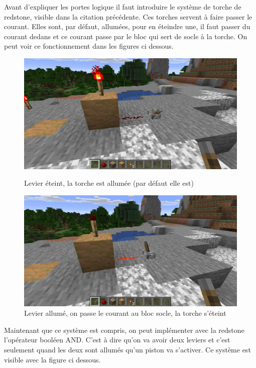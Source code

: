\newpage

Avant d'expliquer les portes logique il faut introduire le système de torche de redstone, visible dans la citation précédente. Ces torches servent à faire passer le courant. Elles sont, par défaut, allumées, pour en éteindre une, il faut passer du courant dedans et ce courant passe par le bloc qui sert de socle à la torche. On peut voir ce fonctionnement dans les figures ci dessous.

\begin{figure}[!htb]
  \centering
  \begin{minipage}[b]{0.45\textwidth}
    \includegraphics[width=\textwidth]{images/minecraft2.png}
    \caption{Levier éteint, la torche est allumée (par défaut elle est)}
  \end{minipage}
  \hfill
  \begin{minipage}[b]{0.45\textwidth}
    \includegraphics[width=\textwidth]{images/minecraft3.png}
    \caption{Levier allumé, on passe le courant au bloc socle, la torche s'éteint}
  \end{minipage}
\end{figure}

Maintenant que ce système est compris, on peut implémenter avec la redstone l'opérateur booléen AND. C'est à dire qu'on va avoir deux leviers et c'est seulement quand les deux sont allumés qu'un piston va s'activer. Ce système est visible avec la figure ci dessous.

